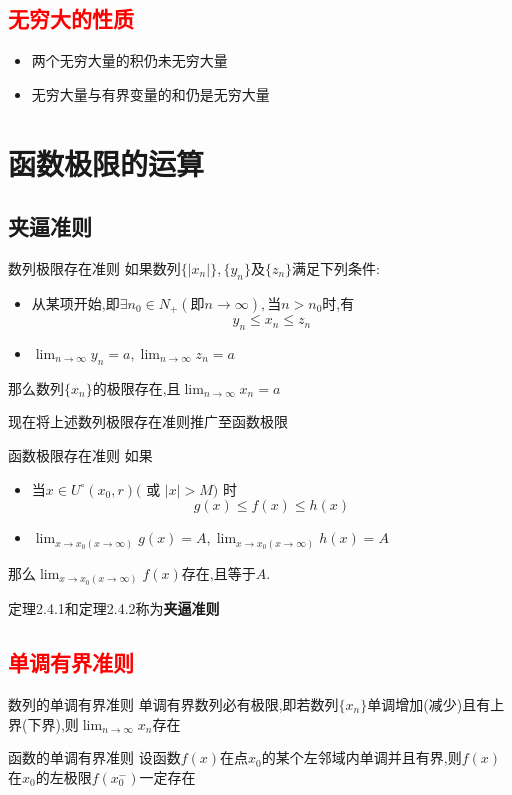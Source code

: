 \documentclass[12pt, a4paper, oneside, UTF8]{ctexbook}  %
\begin{document}
\begin{sloppypar}
    \subsection{\textcolor{red}{无穷大的性质}}
    \begin{itemize}
        \item 两个无穷大量的积仍未无穷大量
        \item 无穷大量与有界变量的和仍是无穷大量
    \end{itemize}
    \section{函数极限的运算}
    \subsection{夹逼准则}
    \begin{them}{数列极限存在准则}{}
        如果数列$\{|x_n|\},\{y_n\}$及$\{z_n\}$满足下列条件:
        \begin{itemize}
            \item 从某项开始,即$\exists n_0 \in N_+(\text{即}n \to \infty),$当$n>n_0$时,有
                  $$
                      y_n \leqslant x_n \leqslant z_n
                  $$
            \item $\lim_{n\to\infty}y_{n}=a,\operatorname*{lim}_{n\to\infty}z_{n}=a$
        \end{itemize}
        那么数列$\{ x_n \}$的极限存在,且$\lim_{n\to\infty}x_{n}=a$
    \end{them}
    现在将上述数列极限存在准则推广至函数极限
    \begin{them}{函数极限存在准则}{}
        如果
        \begin{itemize}
            \item 当$x\in U^{\circ}(x_{0},r)($ 或 $|x|>M)$ 时
                  $$
                      g(x)\leqslant f(x) \leqslant h(x)
                  $$
            \item $\lim_{x\to x_0(x\to\infty)}g(x)=A,\lim_{x\to x_0(x\to\infty)}h(x)=A$
        \end{itemize}
        那么$\lim_{x\to x_0(x\to\infty)}f(x)$存在,且等于$A$.
    \end{them}
    定理2.4.1和定理2.4.2称为\textbf{夹逼准则}
    \subsection{\textcolor{red}{单调有界准则}}
    \begin{them}{数列的单调有界准则}{}
        单调有界数列必有极限,即若数列$\{x_n\}$单调增加(减少)且有上界(下界),则$\lim_{n \to \infty} x_n$存在
    \end{them}
    \begin{them}{函数的单调有界准则}{}
        设函数$f(x)$在点$x_0$的某个左邻域内单调并且有界,则$f(x)$在$x_0$的左极限$f(x_0^-)$一定存在
    \end{them}

\end{sloppypar}
\end{document}
